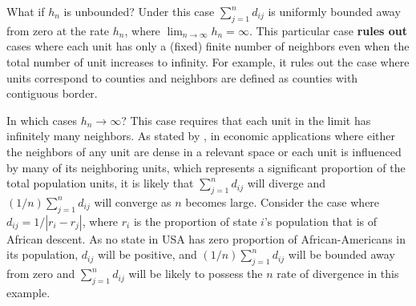 


What if $h_n$ is unbounded? Under this case $\sum_{j = 1}^nd_{ij}$ is uniformly bounded away from zero at the rate $h_n$, where $\lim_{n\to \infty}h_n = \infty$. This particular case \textbf{rules out} cases where each unit has only a (fixed) finite number of neighbors even when the total number of unit increases to infinity. For example, it rules out the case where units correspond to counties and neighbors are defined as counties with contiguous border.

In which cases $h_n \to \infty$? This case requires that each unit in the limit has infinitely many neighbors. As stated by \cite{lee2002consistency}, in economic applications where either the neighbors of any unit are dense in a relevant space or each unit is influenced by many of its neighboring units, which represents a significant proportion of the total population units, it is likely that $\sum_{j = 1}^nd_{ij}$ will diverge and $(1/n)\sum_{j = 1}^nd_{ij}$ will converge as $n$ becomes large. Consider the case where $d_{ij} = 1 / \left|r_i - r_j\right|$, where $r_i$ is the proportion of state $i$'s population that is of African descent. As no state in USA has zero proportion of African-Americans in its population, $d_{ij}$ will be positive, and $(1/n)\sum_{j = 1}^nd_{ij}$ will be bounded away from zero and $\sum_{j = 1}^nd_{ij}$ will be likely to possess the $n$ rate of divergence in this example.

